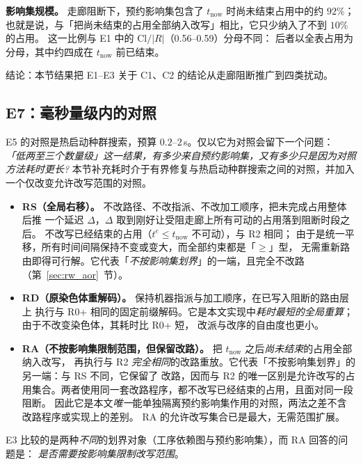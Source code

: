 \documentclass[manuscript,screen,review]{acmart}
\newcommand{\EoneCloLo}{0.56}
\newcommand{\EoneCloHi}{0.59}
\newcommand{\ClosureAliveFrac}{92\%}
\begin{document}
\textbf{影响集规模。} 走廊阻断下，预约影响集包含了 \(t_{\mathrm{now}}\) 时尚未结束占用中的约 \(\ClosureAliveFrac\)；
也就是说，与「把尚未结束的占用全部纳入改写」相比，它只少纳入了不到 \(10\%\) 的占用。
这一比例与 E1 中的 \(\mathrm{Cl}/|R|\)（\EoneCloLo--\EoneCloHi）分母不同：
后者以全表占用为分母，其中约四成在 \(t_{\mathrm{now}}\) 前已结束。

结论：本节结果把 E1--E3 关于 C1、C2 的结论从走廊阻断推广到四类扰动。

\subsection{E7：毫秒量级内的对照}
\label{sec:cheap}

E5 的对照是热启动种群搜索，预算 \(0.2\)--\(2\)\,s。仅以它为对照会留下一个问题：
\emph{「低两至三个数量级」这一结果，有多少来自预约影响集，又有多少只是因为对照方法耗时更长?}
本节补充耗时介于有界修复与热启动种群搜索之间的对照，并加入一个仅改变允许改写范围的对照。

\begin{itemize}[leftmargin=1.5em,itemsep=0.25em]
\item \textbf{RS（全局右移）。} 不改路径、不改指派、不改加工顺序，把未完成占用整体后推
一个延迟 \(\Delta\)，\(\Delta\) 取到刚好让受阻走廊上所有可动的占用落到阻断时段之后。
不改写已经结束的占用（\(t^e\le t_{\mathrm{now}}\) 不可动），与 R2 相同；
由于是统一平移，所有时间间隔保持不变或变大，而全部约束都是「\(\ge\)」型，
无需重新路由即得可行解。它代表「\emph{不按影响集划界}」的一端，且完全不改路
（第~\ref{sec:rw_aor}~节）。
\item \textbf{RD（原染色体重解码）。} 保持机器指派与加工顺序，在已写入阻断的路由层上
执行与 R0+ 相同的固定前缀解码。它是本文实现中\emph{耗时最短的全局重算}；由于不改变染色体，其耗时比 R0+ 短，
改派与改序的自由度也更小。
\item \textbf{RA（不按影响集限制范围，但保留改路）。} 把 \(t_{\mathrm{now}}\) 之后\emph{尚未结束}的占用全部纳入改写，
再执行与 R2 \emph{完全相同}的改路重放。它代表「不按影响集划界」的另一端：与 RS 不同，它保留了
改路，因而与 R2 的唯一区别是允许改写的占用集合。两者使用同一套改路程序，都不改写已经结束的占用，且面对同一段阻断。
因此它是本文\emph{唯一}能单独隔离预约影响集作用的对照，两法之差不含改路程序或实现上的差别。
RA 的允许改写集合已是最大，无需范围扩展。
\end{itemize}

E3 比较的是两种\emph{不同}的划界对象（工序依赖图与预约影响集），而 RA 回答的问题是：
\emph{是否需要按影响集限制改写范围}。
\end{document}
